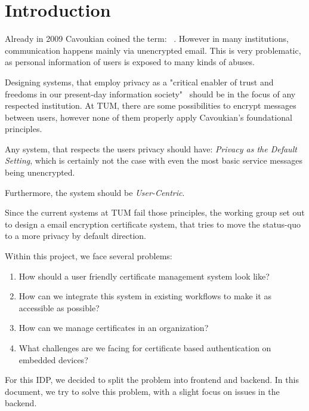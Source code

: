 \chapter{Introduction}\label{ch:introduction}
Already in 2009 Cavoukian coined the term: ~\cite{cavoukian2009privacy}.
However in many institutions, communication happens mainly via unencrypted email.
This is very problematic, as personal information of users is exposed to many kinds of abuses.

Designing systems, that employ privacy as a "critical enabler of trust and freedoms in our present-day information
society"~\cite{cavoukian2009privacy} should be in the focus of any respected institution.
At TUM, there are some possibilities to encrypt messages between users, however none of them properly apply Cavoukian's
foundational principles.

Any system, that respects the users privacy should have:
\emph{Privacy as the Default Setting}, which is certainly not the case with even the most basic service messages being
unencrypted.

Furthermore, the system should be \emph{User-Centric}.

Since the current systems at TUM fail those principles, the working group  set out to design a email
encryption certificate system, that tries to move the status-quo to a more privacy by default direction.

Within this project, we face several problems:
\begin{enumerate}
    \item How should a user friendly certificate management system look like?
    \item How can we integrate this system in existing workflows to make it as accessible as possible?
    \item How can we manage certificates in an organization?
    \item What challenges are we facing for certificate based authentication on embedded devices?
\end{enumerate}

For this IDP, we decided to split the problem into frontend and backend.
In this document, we try to solve this problem, with a slight focus on issues in the backend.
